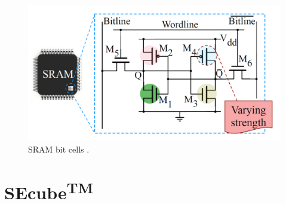 \begin{figure}[h!]
\vspace{0.5cm}
\includegraphics[width=\textwidth]{images/SRAM_cell.png}
\caption{SRAM bit cells \cite{PUF_Sutar}. }
\label{fig:SRAM_cell} %
\end{figure}


\section{SEcube\textsuperscript{TM}}





